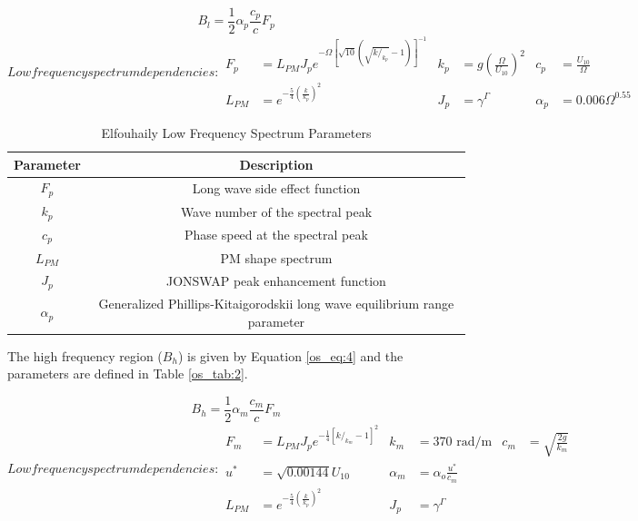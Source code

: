 \begin{equation}
  \label{os_eq:3}
 B_l = \frac{1}{2} \alpha_p \frac{c_p}{c} F_p
\end{equation}
\renewcommand{\baselinestretch}{2} \small\normalsize
\begin{subequations}
   Low frequency spectrum dependencies:
\begin{align*}
  F_p &= L_{PM}J_pe^{-\Omega\left[\sqrt{10}\left(\sqrt{k/_{k_p}} - 1 \right) \right]^{-1}} &  k_p &= g\left(\frac{\Omega}{U_{10}}\right)^2 & c_p &= \frac{U_{10}}{\Omega} \\
   L_{PM} &=e^{-\frac{5}{4}\left(\frac{k}{k_p} \right)^2} &  J_p &= \gamma^\Gamma  & \alpha_p &= 0.006\Omega^{0.55} 
\end{align*}
\end{subequations}
\renewcommand{\baselinestretch}{2} \small\normalsize

\begin{table}[H]
\begin{center}
\begin{tabular} {|c | c |}
  Parameter & Description \\ \hline
  $F_p$ & Long wave side effect function \\ \hline
  $k_p$ &  Wave number of the spectral peak \\ \hline
  $c_p$ &  Phase speed at the spectral peak \\ \hline
  $L_{PM}$ & PM shape spectrum \\ \hline
  $J_p$ & JONSWAP peak enhancement function \\ \hline
   $\alpha_p$ & Generalized Phillips-Kitaigorodskii long wave equilibrium range parameter
\end{tabular}
  \renewcommand{\baselinestretch}{1} \small\normalsize
  \begin{quote}
    \caption[Elfouhaily Low Frequency Spectrum Parameters]{Elfouhaily Low Frequency Spectrum Parameters\label{os_tab:1}}
  \end{quote}
\end{center}
\end{table}
\renewcommand{\baselinestretch}{2} \small\normalsize

The high frequency region ($B_h$) is given by Equation \ref{os_eq:4} and the parameters are defined in Table \ref{os_tab:2}.

\begin{equation}
  \label{os_eq:4}
 B_h = \frac{1}{2} \alpha_m \frac{c_m}{c} F_m
\end{equation}
\renewcommand{\baselinestretch}{2} \small\normalsize
\begin{subequations}
   Low frequency spectrum dependencies:
\begin{align*}
  F_m &= L_{PM}J_pe^{-\frac{1}{4}\left[k/_{k_m} - 1 \right]^2 } & k_m & = 370 \text{ rad/m} &  c_m &=\sqrt{\frac{2g}{k_m}} \\
  u^* &= \sqrt{0.00144}U_{10}  & \alpha_m &= \alpha_o\frac{u^*}{c_m}  \\
  L_{PM} &=e^{-\frac{5}{4}\left(\frac{k}{k_p} \right)^2}  &  J_p &= \gamma^\Gamma
\end{align*}
\end{subequations}
\renewcommand{\baselinestretch}{2} \small\normalsize

